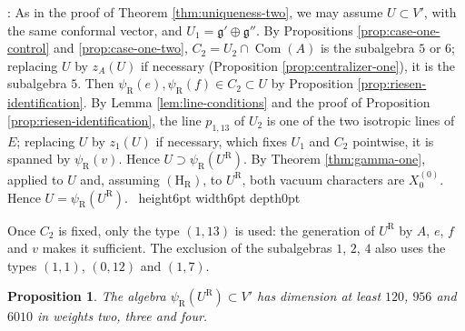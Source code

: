 \documentclass[leqno]{article}
\newcommand{\qed}{\hfill \vrule height6pt  width6pt depth0pt}
\newtheorem{prop}[thm]{Proposition}
\newenvironment{proof}[1][]{\noindent {\it Proof #1} : }{\hbox{~}\qed
\smallskip
}
\numberwithin{equation}{section}
\begin{document}
\begin{proof}
As in the proof of Theorem \ref{thm:uniqueness-two}, we may assume $U \subset V'$, with the same conformal vector, and $U_1 = \mathfrak g' \oplus \mathfrak g''$. By Propositions \ref{prop:case-one-control} and \ref{prop:case-one-two}, $C_2 = U_2 \cap \operatorname{Com}(A)$ is the subalgebra $5$ or $6$; replacing $U$ by $z_A(U)$ if necessary (Proposition \ref{prop:centralizer-one}), it is the subalgebra $5$. Then $\psi_{\mathrm R}(e), \psi_{\mathrm R}(f) \in C_2 \subset U$ by Proposition \ref{prop:riesen-identification}. By Lemma \ref{lem:line-conditions} and the proof of Proposition \ref{prop:riesen-identification}, the line $p_{1,13}$ of $U_2$ is one of the two isotropic lines of $E$; replacing $U$ by $z_1(U)$ if necessary, which fixes $U_1$ and $C_2$ pointwise, it is spanned by $\psi_{\mathrm R}(v)$. Hence $U \supset \psi_{\mathrm R}(U^{\mathrm R})$. By Theorem \ref{thm:gamma-one}, applied to $U$ and, assuming $\mathrm{(H_R)}$, to $U^{\mathrm R}$, both vacuum characters are $X^{(0)}_0$. Hence $U = \psi_{\mathrm R}(U^{\mathrm R})$.
\end{proof}

Once $C_2$ is fixed, only the type $(1,13)$ is used: the generation of $U^{\mathrm R}$ by $A$, $e$, $f$ and $v$ makes it sufficient. The exclusion of the subalgebras $1$, $2$, $4$ also uses the types $(1,1)$, $(0,12)$ and $(1,7)$.

\begin{prop}
\label{prop:riesen-dims}
The algebra $\psi_{\mathrm R}(U^{\mathrm R}) \subset V'$ has dimension at least $120$, $956$ and $6010$ in weights two, three and four.
\end{prop}
\end{document}
